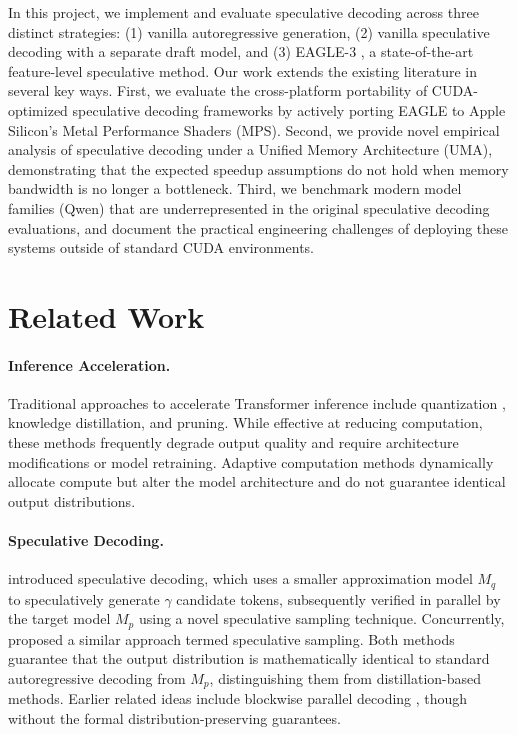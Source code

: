 \documentclass[11pt]{article}
\begin{document}
In this project, we implement and evaluate speculative decoding across three distinct strategies: (1) vanilla autoregressive generation, (2) vanilla speculative decoding with a separate draft model, and (3) EAGLE-3 \citep{li2024eagle}, a state-of-the-art feature-level speculative method. Our work extends the existing literature in several key ways. First, we evaluate the cross-platform portability of CUDA-optimized speculative decoding frameworks by actively porting EAGLE to Apple Silicon's Metal Performance Shaders (MPS). Second, we provide novel empirical analysis of speculative decoding under a Unified Memory Architecture (UMA), demonstrating that the expected speedup assumptions do not hold when memory bandwidth is no longer a bottleneck. Third, we benchmark modern model families (Qwen) that are underrepresented in the original speculative decoding evaluations, and document the practical engineering challenges of deploying these systems outside of standard CUDA environments.

\section{Related Work}

\paragraph{Inference Acceleration.}
Traditional approaches to accelerate Transformer inference include quantization \citep{hubara2017quantized}, knowledge distillation, and pruning. While effective at reducing computation, these methods frequently degrade output quality and require architecture modifications or model retraining. Adaptive computation methods \citep{schuster2021confident} dynamically allocate compute but alter the model architecture and do not guarantee identical output distributions.

\paragraph{Speculative Decoding.}
\citet{leviathan2023fast} introduced speculative decoding, which uses a smaller approximation model $M_q$ to speculatively generate $\gamma$ candidate tokens, subsequently verified in parallel by the target model $M_p$ using a novel speculative sampling technique. Concurrently, \citet{chen2023accelerating} proposed a similar approach termed speculative sampling. Both methods guarantee that the output distribution is mathematically identical to standard autoregressive decoding from $M_p$, distinguishing them from distillation-based methods. Earlier related ideas include blockwise parallel decoding \citep{stern2018blockwise}, though without the formal distribution-preserving guarantees.
\end{document}
